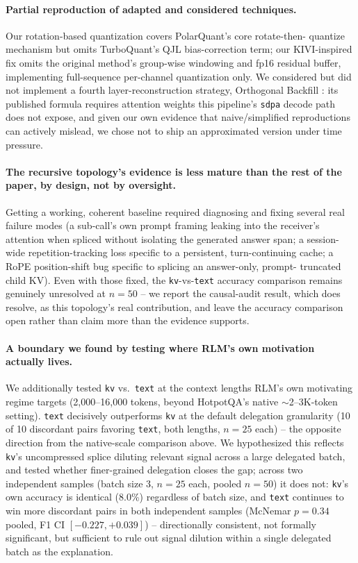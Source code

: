 \documentclass[11pt]{article}
\begin{document}
\paragraph{Partial reproduction of adapted and considered techniques.}
Our rotation-based quantization covers PolarQuant's core rotate-then-
quantize mechanism but omits TurboQuant's QJL bias-correction term; our
KIVI-inspired fix omits the original method's group-wise windowing and
fp16 residual buffer, implementing full-sequence per-channel quantization
only. We considered but did not implement a fourth layer-reconstruction
strategy, Orthogonal Backfill \citep{orthobackfill2026}: its published
formula requires attention weights this pipeline's \texttt{sdpa} decode
path does not expose, and given our own evidence that naive/simplified
reproductions can actively mislead, we chose not to ship an approximated
version under time pressure.

\paragraph{The recursive topology's evidence is less mature than the rest
of the paper, by design, not by oversight.} Getting a working, coherent
baseline required diagnosing and fixing several real failure modes (a
sub-call's own prompt framing leaking into the receiver's attention when
spliced without isolating the generated answer span; a session-wide
repetition-tracking loss specific to a persistent, turn-continuing cache;
a RoPE position-shift bug specific to splicing an answer-only, prompt-
truncated child KV). Even with those fixed, the \texttt{kv}-vs-\texttt{text}
accuracy comparison remains genuinely unresolved at $n=50$ -- we report
the causal-audit result, which does resolve, as this topology's real
contribution, and leave the accuracy comparison open rather than claim
more than the evidence supports.

\paragraph{A boundary we found by testing where RLM's own motivation
actually lives.} We additionally tested \texttt{kv} vs.\ \texttt{text}
at the context lengths RLM's own motivating regime targets
(2,000--16,000 tokens, beyond HotpotQA's native $\sim$2--3K-token
setting). \texttt{text} decisively outperforms \texttt{kv} at the
default delegation granularity (10 of 10 discordant pairs favoring
\texttt{text}, both lengths, $n=25$ each) -- the opposite direction from
the native-scale comparison above. We hypothesized this reflects
\texttt{kv}'s uncompressed splice diluting relevant signal across a
large delegated batch, and tested whether finer-grained delegation
closes the gap; across two independent samples (batch size 3, $n=25$
each, pooled $n=50$) it does not: \texttt{kv}'s own accuracy is
identical (8.0\%) regardless of batch size, and \texttt{text} continues
to win more discordant pairs in both independent samples (McNemar
$p=0.34$ pooled, F1 CI $[-0.227,+0.039]$) -- directionally consistent,
not formally significant, but sufficient to rule out signal dilution
within a single delegated batch as the explanation.
\end{document}
